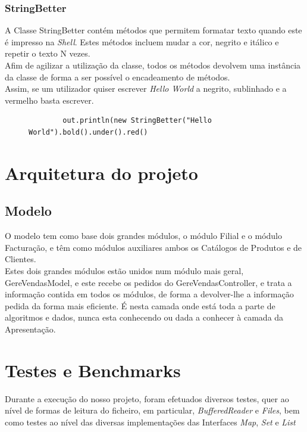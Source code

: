 \documentclass[a4paper]{report}
\begin{document}
\subsection{StringBetter}

A Classe StringBetter contém métodos que permitem formatar texto quando este é impresso na
\textit{Shell}. Estes métodos incluem mudar a cor, negrito e itálico e repetir o texto N vezes.\\
Afim de agilizar a utilização da classe, todos os métodos devolvem uma instância da classe
de forma a ser possível o encadeamento de métodos.\\
Assim, se um utilizador quiser escrever \textit{Hello World} a negrito, sublinhado e a
vermelho basta escrever.
\begin{figure}[H]
    \begin{center}
        \begin{verbatim}
        out.println(new StringBetter("Hello World").bold().under().red()
        \end{verbatim}
    \end{center}
\end{figure}

\chapter{Arquitetura do projeto}

\section{Modelo}

O modelo tem como base dois grandes módulos, o módulo Filial e o módulo Facturação,
e têm como módulos auxiliares ambos os Catálogos de Produtos e de Clientes.\\
Estes dois grandes módulos estão unidos num módulo mais geral, GereVendasModel, 
e este recebe os pedidos do GereVendasController, e trata a informação contida 
em todos os módulos, de forma a devolver-lhe a informação pedida da forma mais 
eficiente. É nesta camada onde está toda a parte de algoritmos e dados, nunca 
esta conhecendo ou dada a conhecer à camada da Apresentação.

\chapter{Testes e Benchmarks}

Durante a execução do nosso projeto, foram efetuados diversos testes, quer ao nível
de formas de leitura do ficheiro, em particular, \textit{BufferedReader} e \textit{Files},
bem como testes ao nível das diversas implementações das Interfaces \textit{Map},
\textit{Set} e \textit{List}
\end{document}
